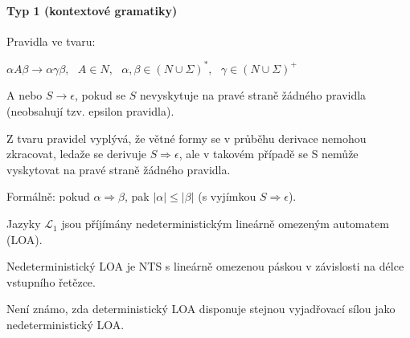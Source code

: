 \paragraph*{Typ 1 (kontextové gramatiky)} \begin{compactitem}
    \item Pravidla ve tvaru: \begin{compactitem}
        \item $\alpha A \beta \rightarrow \alpha \gamma \beta,~~~ A \in N,~~~ \alpha, \beta \in (N \cup \Sigma)^*,~~~ \gamma \in (N \cup \Sigma)^+$
        \item A nebo $S \rightarrow \epsilon$, pokud se $S$ nevyskytuje na pravé straně žádného pravidla (neobsahují tzv. epsilon pravidla).
        \item Z tvaru pravidel vyplývá, že větné formy se v průběhu derivace nemohou zkracovat, ledaže se derivuje $S \Rightarrow \epsilon$, ale v takovém případě se S nemůže vyskytovat na pravé straně žádného pravidla.
        \item Formálně: pokud $\alpha \Rightarrow \beta$, pak $|\alpha| \leq |\beta|$ (s vyjímkou $S \Rightarrow \epsilon$).
    \end{compactitem}

    \item Jazyky $\mathcal{L}_1$ jsou příjímány nedeterministickým lineárně omezeným automatem (LOA). \begin{compactitem}
        \item Nedeterministický LOA je NTS s lineárně omezenou páskou v závislosti na délce vstupního řetězce.
        \item Není známo, zda deterministický LOA disponuje stejnou vyjadřovací sílou jako nedeterministický LOA.
    \end{compactitem}
\end{compactitem}

